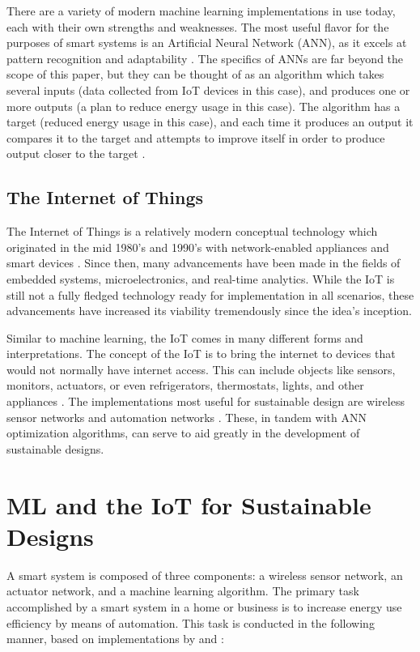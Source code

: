 \documentclass[letterpaper]{article}
\begin{document}
There are a variety of modern machine learning implementations in use today, each with their own strengths and weaknesses. The most useful flavor for the purposes of smart systems is an Artificial Neural Network (ANN), as it excels at pattern recognition and adaptability \cite{bishop06}. The specifics of ANNs are far beyond the scope of this paper, but they can be thought of as an algorithm which takes several inputs (data collected from IoT devices in this case), and produces one or more outputs (a plan to reduce energy usage in this case). The algorithm has a target (reduced energy usage in this case), and each time it produces an output it compares it to the target and attempts to improve itself in order to produce output closer to the target \cite{bonaccorso17}.

\subsection{The Internet of Things} \label{IoTinfo}
The Internet of Things is a relatively modern conceptual technology which originated in the mid 1980's and 1990's with network-enabled appliances and smart devices \cite{weiser91}. Since then, many advancements have been made in the fields of embedded systems, microelectronics, and real-time analytics. While the IoT is still not a fully fledged technology ready for implementation in all scenarios, these advancements have increased its viability tremendously since the idea's inception.\par

Similar to machine learning, the IoT comes in many different forms and interpretations. The concept of the IoT is to bring the internet to devices that would not normally have internet access. This can include objects like sensors, monitors, actuators, or even refrigerators, thermostats, lights, and other appliances \cite{wortmann15}. The implementations most useful for sustainable design are wireless sensor networks and automation networks \cite{atzori10}. These, in tandem with ANN optimization algorithms, can serve to aid greatly in the development of sustainable designs.

\section{ML and the IoT for Sustainable Designs} \label{main}
A smart system is composed of three components: a wireless sensor network, an actuator network, and a machine learning algorithm. The primary task accomplished by a smart system in a home or business is to increase energy use efficiency by means of automation. This task is conducted in the following manner, based on implementations by \textcite{pang15} and \textcite{risteska17}:
\end{document}

